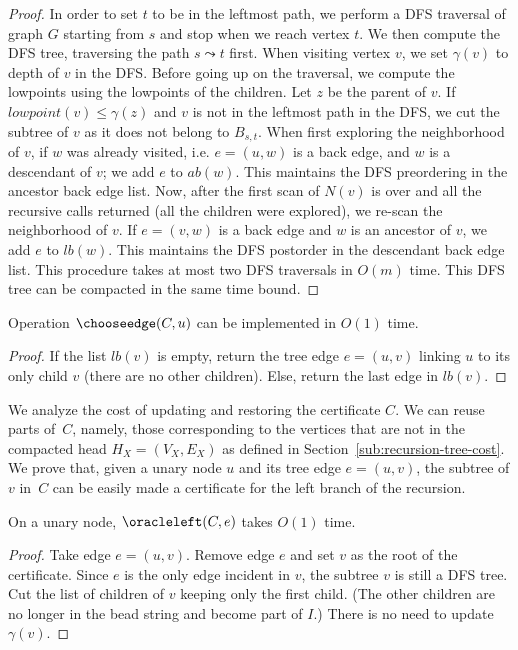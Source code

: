 \begin{proof}
	In order to set $t$ to be in the leftmost path, we perform a
        DFS traversal of graph $G$ starting from $s$ and stop when we
        reach vertex $t$. We then compute the DFS tree, traversing the
        path $s \leadsto t$ first. When visiting vertex $v$, we set
        $\gamma(v)$ to depth of $v$ in the DFS. Before going up on the
        traversal, we compute the lowpoints using the lowpoints of the
        children. Let $z$ be the parent of $v$. If
        $\mathit{lowpoint}(v) \leq \gamma(z)$ and $v$ is not in the
        leftmost path in the DFS, we cut the subtree of $v$ as it does
        not belong to $B_{s,t}$.  When first exploring the
        neighborhood of $v$, if $w$ was already visited,
        i.e. $e=(u,w)$ is a back edge, and $w$ is a descendant of $v$;
        we add $e$ to $ab(w)$. This maintains the DFS preordering in
        the ancestor back edge list. Now, after the first scan of
        $N(v)$ is over and all the recursive calls returned (all the
        children were explored), we re-scan the neighborhood of
        $v$. If $e=(v,w)$ is a back edge and $w$ is an ancestor of
        $v$, we add $e$ to $lb(w)$. This maintains the DFS
        postorder in the descendant back edge list. This procedure
        takes at most two DFS traversals in $O(m)$ time.  This DFS
        tree can be compacted in the same time bound.  
\end{proof}

\begin{lemma}
	\label{lem:choose}
	Operation $\chooseedge(C,u)$ can be implemented in $O(1)$ time.
\end{lemma}
\begin{proof}
If the list $lb(v)$ is empty, return the tree edge $e=(u,v)$ linking $u$
to its only child $v$ (there are no other children).  Else,
return the last edge in $lb(v)$. 
\end{proof}

We analyze the cost of updating and restoring the
certificate $C$. We can reuse parts of~$C$,
namely, those corresponding to the vertices that are not in the
compacted head $H_X = (V_X,E_X)$ as defined in
Section~\ref{sub:recursion-tree-cost}.
We prove that, given a unary node $u$ and its tree edge $e=(u,v)$, the
subtree of $v$ in~$C$ can be easily made a certificate for the left
branch of the recursion.

\begin{lemma}
	\label{lem:unary_left}
	On a unary node, $\oracleleft(C,e)$ takes $O(1)$
	time.
\end{lemma}
\begin{proof}
	Take edge $e=(u,v)$. Remove edge $e$ and set $v$ as the root
	of the certificate. Since $e$ is the only edge incident in
	$v$, the subtree $v$ is still a DFS tree. Cut the list of children
	of $v$ keeping only the first child. (The other children are no
	longer in the bead string and become part of $I$.) There is
	no need to update $\gamma(v)$. 
\end{proof}

